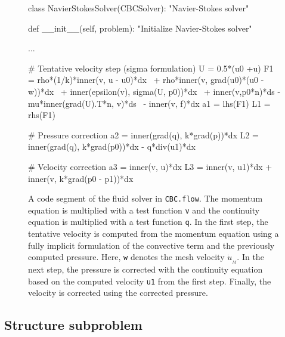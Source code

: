 \begin{figure}
\begin{center}
\begin{python}
 class NavierStokesSolver(CBCSolver):
    "Navier-Stokes solver"

   def __init__(self, problem):
        "Initialize Navier-Stokes solver"

        ...
        
        # Tentative velocity step (sigma formulation)
        U = 0.5*(u0 +u)                                                                                                                                     
        F1 = rho*(1/k)*inner(v, u - u0)*dx \
           + rho*inner(v, grad(u0)*(u0 - w))*dx \
           + inner(epsilon(v), sigma(U, p0))*dx \
           + inner(v,p0*n)*ds - mu*inner(grad(U).T*n, v)*ds \
           - inner(v, f)*dx     
        a1 = lhs(F1)
        L1 = rhs(F1)

        # Pressure correction
        a2 = inner(grad(q), k*grad(p))*dx
        L2 = inner(grad(q), k*grad(p0))*dx - q*div(u1)*dx
  
        # Velocity correction
        a3 = inner(v, u)*dx
        L3 = inner(v, u1)*dx + inner(v, k*grad(p0 - p1))*dx
\end{python}
\caption{A code segment of the fluid solver in \texttt{CBC.flow}. The
  momentum equation is multiplied with a test function \texttt{v} and
  the continuity equation is multiplied with a test function
  \texttt{q}. In the first step, the tentative velocity is computed
  from the momentum equation using a fully implicit formulation of the
  convective term and the previously computed pressure. Here, \texttt{w}
  denotes the mesh velocity $\dot{u}_{_{M}}$. In the next step, the
  pressure is corrected with the continuity equation based on the
  computed velocity \texttt{u1} from the first step. Finally, the
  velocity is corrected using the corrected pressure.}
\label{selim:fig:fluidsolver}
\end{center}
\end{figure}


\subsection{Structure subproblem}

